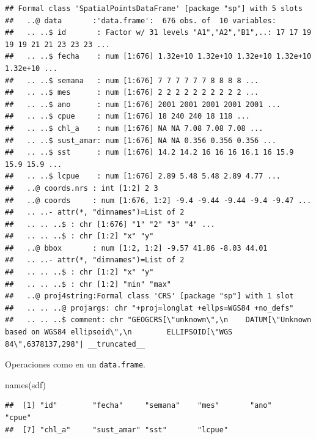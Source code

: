 \documentclass[
  spanish,
]{book}
\newenvironment{Shaded}{\begin{snugshade}}{\end{snugshade}}
\newcommand{\CommentTok}[1]{\textcolor[rgb]{0.56,0.35,0.01}{\textit{#1}}}
\newcommand{\FunctionTok}[1]{\textcolor[rgb]{0.00,0.00,0.00}{#1}}
\newcommand{\NormalTok}[1]{#1}
\newcommand{\SpecialCharTok}[1]{\textcolor[rgb]{0.00,0.00,0.00}{#1}}
\theoremstyle{break}
\begin{document}
\begin{verbatim}
## Formal class 'SpatialPointsDataFrame' [package "sp"] with 5 slots
##   ..@ data       :'data.frame':  676 obs. of  10 variables:
##   .. ..$ id       : Factor w/ 31 levels "A1","A2","B1",..: 17 17 19 19 19 21 21 23 23 23 ...
##   .. ..$ fecha    : num [1:676] 1.32e+10 1.32e+10 1.32e+10 1.32e+10 1.32e+10 ...
##   .. ..$ semana   : num [1:676] 7 7 7 7 7 7 8 8 8 8 ...
##   .. ..$ mes      : num [1:676] 2 2 2 2 2 2 2 2 2 2 ...
##   .. ..$ ano      : num [1:676] 2001 2001 2001 2001 2001 ...
##   .. ..$ cpue     : num [1:676] 18 240 240 18 118 ...
##   .. ..$ chl_a    : num [1:676] NA NA 7.08 7.08 7.08 ...
##   .. ..$ sust_amar: num [1:676] NA NA 0.356 0.356 0.356 ...
##   .. ..$ sst      : num [1:676] 14.2 14.2 16 16 16 16.1 16 15.9 15.9 15.9 ...
##   .. ..$ lcpue    : num [1:676] 2.89 5.48 5.48 2.89 4.77 ...
##   ..@ coords.nrs : int [1:2] 2 3
##   ..@ coords     : num [1:676, 1:2] -9.4 -9.44 -9.44 -9.4 -9.47 ...
##   .. ..- attr(*, "dimnames")=List of 2
##   .. .. ..$ : chr [1:676] "1" "2" "3" "4" ...
##   .. .. ..$ : chr [1:2] "x" "y"
##   ..@ bbox       : num [1:2, 1:2] -9.57 41.86 -8.03 44.01
##   .. ..- attr(*, "dimnames")=List of 2
##   .. .. ..$ : chr [1:2] "x" "y"
##   .. .. ..$ : chr [1:2] "min" "max"
##   ..@ proj4string:Formal class 'CRS' [package "sp"] with 1 slot
##   .. .. ..@ projargs: chr "+proj=longlat +ellps=WGS84 +no_defs"
##   .. .. ..$ comment: chr "GEOGCRS[\"unknown\",\n    DATUM[\"Unknown based on WGS84 ellipsoid\",\n        ELLIPSOID[\"WGS 84\",6378137,298"| __truncated__
\end{verbatim}

Operaciones como en un \texttt{data.frame}.

\begin{Shaded}
\begin{Highlighting}[]
\FunctionTok{names}\NormalTok{(sdf)}
\end{Highlighting}
\end{Shaded}

\begin{verbatim}
##  [1] "id"        "fecha"     "semana"    "mes"       "ano"       "cpue"     
##  [7] "chl_a"     "sust_amar" "sst"       "lcpue"
\end{verbatim}

\begin{Shaded}
\end{Shaded}
\end{document}
